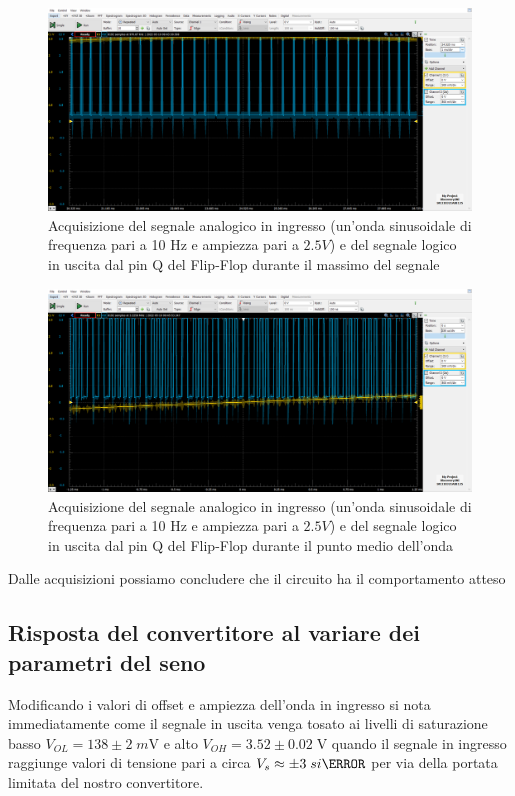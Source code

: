 \documentclass[10pt, a4paper, italian]{article}
\begin{document}
\begin{figure}[htbp]
    \centering
	\includegraphics[width=\textwidth]{TOP}
    \caption{Acquisizione del segnale analogico in ingresso (un'onda sinusoidale di frequenza pari a 10 Hz e ampiezza pari a $2.5 V$) e del segnale logico in uscita dal pin Q del Flip-Flop durante il massimo del segnale}
\end{figure}
\begin{figure}[htbp]
    \centering
	\includegraphics[width=\textwidth]{MIDDLE}
    \caption{Acquisizione del segnale analogico in ingresso (un'onda sinusoidale di frequenza pari a 10 Hz e ampiezza pari a $2.5 V$) e del segnale logico in uscita dal pin Q del Flip-Flop durante il punto medio dell'onda}
\end{figure}
Dalle acquisizioni possiamo concludere che il circuito ha il comportamento atteso
\subsection{Risposta del convertitore al variare dei parametri del seno}
\label{sbs: adcresp}
Modificando i valori di offset e ampiezza dell'onda in ingresso si nota
immediatamente come il segnale in uscita venga tosato ai livelli di
saturazione basso $V_{OL} = 138 \pm 2 \; \si{m\V}$ e alto
$V_{OH} = 3.52 \pm 0.02 \; \si{\V}$ quando il segnale in ingresso raggiunge
valori di tensione pari a circa $V_s \approx \pm 3 \; si{\V}$ per via della
portata limitata del nostro convertitore.
\end{document}

